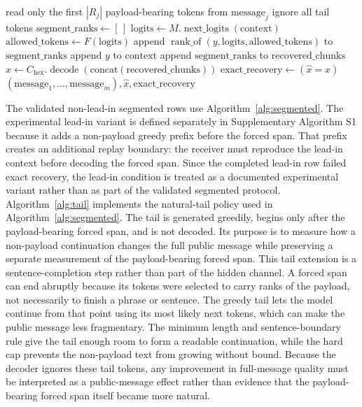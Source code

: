 \documentclass[fleqn,10pt]{wlscirep}
\newcommand{\RankOf}{\operatorname{rank\_of}}
\newcommand{\Decode}{\operatorname{decode}}
\newcommand{\NextLogits}{\operatorname{next\_logits}}
\begin{document}
\begin{algorithm}[H]
\begin{algorithmic}[1]
    \State read only the first \(|R_j|\) payload-bearing tokens from \(\mathrm{message}_j\)
    \State ignore all tail tokens
    \State \(\mathrm{segment\_ranks} \gets [\,]\)
        \State \(\mathrm{logits} \gets M.\NextLogits(\mathrm{context})\)
        \State \(\mathrm{allowed\_tokens} \gets F(\mathrm{logits})\)
        \State append \(\RankOf(y,\mathrm{logits},\mathrm{allowed\_tokens})\) to \(\mathrm{segment\_ranks}\)
        \State append \(y\) to \(\mathrm{context}\)
    \EndFor
    \State append \(\mathrm{segment\_ranks}\) to \(\mathrm{recovered\_chunks}\)
\EndFor
\State \(\hat{x} \gets C_{\mathrm{hex}}.\Decode(\mathrm{concat}(\mathrm{recovered\_chunks}))\)
\State \(\mathrm{exact\_recovery} \gets (\hat{x}=x)\)
\State \Return \((\mathrm{message}_1,\ldots,\mathrm{message}_m),\hat{x},\mathrm{exact\_recovery}\)
\end{algorithmic}
\end{algorithm}

The validated non-lead-in segmented rows use Algorithm~\ref{alg:segmented}. The experimental lead-in variant is defined separately in Supplementary Algorithm S1 because it adds a non-payload greedy prefix before the forced span. That prefix creates an additional replay boundary: the receiver must reproduce the lead-in context before decoding the forced span. Since the completed lead-in row failed exact recovery, the lead-in condition is treated as a documented experimental variant rather than as part of the validated segmented protocol. Algorithm~\ref{alg:tail} implements the natural-tail policy used in Algorithm~\ref{alg:segmented}. The tail is generated greedily, begins only after the payload-bearing forced span, and is not decoded. Its purpose is to measure how a non-payload continuation changes the full public message while preserving a separate measurement of the payload-bearing forced span.
This tail extension is a sentence-completion step rather than part of the hidden channel. A forced span can end abruptly because its tokens were selected to carry ranks of the payload, not necessarily to finish a phrase or sentence. The greedy tail lets the model continue from that point using its most likely next tokens, which can make the public message less fragmentary. The minimum length and sentence-boundary rule give the tail enough room to form a readable continuation, while the hard cap prevents the non-payload text from growing without bound. Because the decoder ignores these tail tokens, any improvement in full-message quality must be interpreted as a public-message effect rather than evidence that the payload-bearing forced span itself became more natural.
\end{document}
